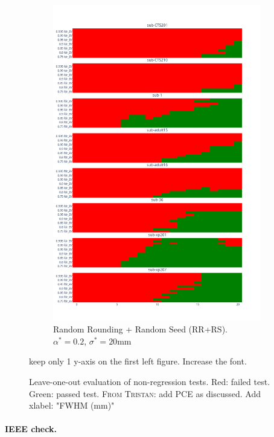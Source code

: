 \documentclass{article}
\newcommand{\TG}[1]{\color{blue}\textsc{From Tristan:} #1\color{black}\xspace}
\begin{document}
\begin{figure}
\begin{subfigure}[t]{0.3\textwidth}
         \includegraphics[width=\textwidth]{figures/rr-rs.png}
         \caption{\centering Random Rounding + Random Seed (RR+RS). $\alpha^*=0.2$, $\sigma^*=20$mm}
         \label{fig:rr-rs}
     \end{subfigure}
    \caption{Leave-one-out evaluation of non-regression tests. Red: failed test. Green: passed test. \TG{add PCE as discussed. Add xlabel: "FWHM (mm)"}}
    \label{fig:evaluation-rr-rs-rr+rs}
    keep only 1 y-axis on the first left figure. Increase the font.
\end{figure}

\paragraph{IEEE check.}
\end{document}
